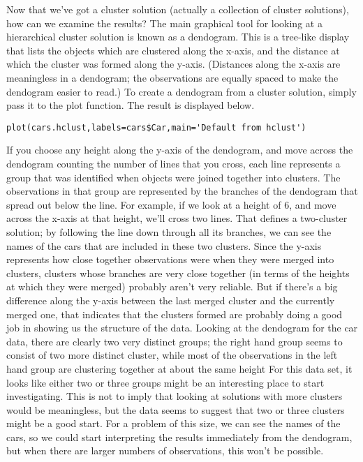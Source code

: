 {Now that we've got a cluster solution (actually a collection of cluster solutions), how can we examine the results? The main graphical tool for looking at a hierarchical cluster solution is known as a dendogram. This is a tree-like display that lists the objects which are clustered along the x-axis, and the distance at which the cluster was formed along the y-axis. (Distances along the x-axis are meaningless in a dendogram; the observations are equally spaced to make the dendogram easier to read.) To create a dendogram from a cluster solution, simply pass it to the plot function. The result is displayed below.
\begin{framed}
\begin{verbatim}
plot(cars.hclust,labels=cars$Car,main='Default from hclust')

\end{verbatim}
\end{framed}
If you choose any height along the y-axis of the dendogram, and move across the dendogram counting the number of lines that you cross, each line represents a group that was identified when objects were joined together into clusters. The observations in that group are represented by the branches of the dendogram that spread out below the line. For example, if we look at a height of 6, and move across the x-axis at that height, we'll cross two lines. That defines a two-cluster solution; by following the line down through all its branches, we can see the names of the cars that are included in these two clusters. Since the y-axis represents how close together observations were when they were merged into clusters, clusters whose branches are very close together (in terms of the heights at which they were merged) probably aren't very reliable. But if there's a big difference along the y-axis between the last merged cluster and the currently merged one, that indicates that the clusters formed are probably doing a good job in showing us the structure of the data. Looking at the dendogram for the car data, there are clearly two very distinct groups; the right hand group seems to consist of two more distinct cluster, while most of the observations in the left hand group are clustering together at about the same height For this data set, it looks like either two or three groups might be an interesting place to start investigating. This is not to imply that looking at solutions with more clusters would be meaningless, but the data seems to suggest that two or three clusters might be a good start. For a problem of this size, we can see the names of the cars, so we could start interpreting the results immediately from the dendogram, but when there are larger numbers of observations, this won't be possible.
}
